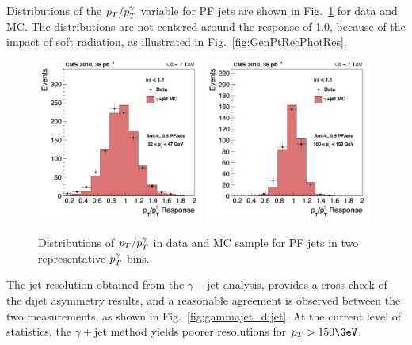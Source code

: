 Distributions of the $p_{{T}}/p_{{T}}^{\gamma}$ variable for PF jets are shown in Fig.~\ref{fig:response} for data and MC. The distributions are not centered around the response of 1.0, because of the impact of soft radiation, as illustrated in Fig.~\ref{fig:GenPtRecPhotRes}.

\begin{figure}[t]
\centering
\includegraphics[width=0.49\textwidth]{Figures/JER/figs/res_photon/response_L2L3_eta011_ptPhot_32_47}
\includegraphics[width=0.49\textwidth]{Figures/JER/figs/res_photon/response_L2L3_eta011_ptPhot_100_150}
\caption{Distributions of $p_{{T}}/p_{{T}}^{\gamma}$ in data and MC sample for PF jets in two representative $p_{{T}}^{\gamma}$ bins.}
\label{fig:response}
\end{figure}

The jet \pt resolution obtained from the $\gamma+$jet analysis, 
provides a cross-check of the dijet asymmetry results, and a 
reasonable agreement is observed between the two measurements, as 
shown in Fig.~\ref{fig:gammajet_dijet}. At the current level of statistics, 
the $\gamma+$jet method  yields poorer resolutions for $\pt>150\GeV$.

